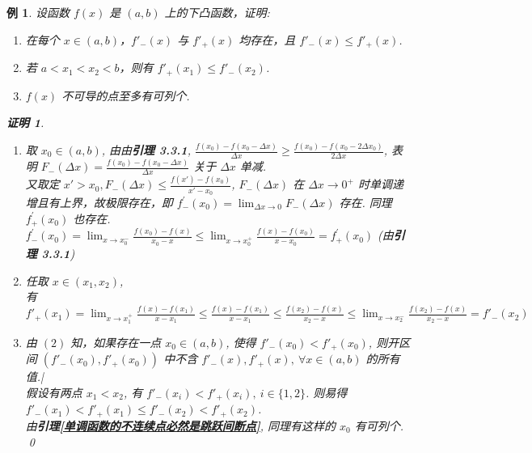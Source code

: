 \documentclass{ctexart}
\newcommand{\。}{．} %
\newcommand{\ds}{^\prime}
\newenvironment{zise}{
    \begin{tcolorbox}[enhanced, colback=qzi, boxrule=0pt, frame hidden,
        borderline west={0.7mm}{0.1mm}{szi}]
    }
    {\end{tcolorbox}}
\theoremstyle{t} %
\newtheorem{lthj}{\color{szi} 例}[subsection]
\newtheorem*{zmhj}{\color{slan} 证明}
\newenvironment{lt}{\begin{zise}\begin{lthj}}{\end{lthj}\end{zise}}
\begin{document}
\begin{lt}
    设函数 $f(x)$ 是 $(a, b)$ 上的下凸函数，证明:
    \begin{enumerate}
        \item [(1)] 在每个 $x \in (a, b)$，$f'_-(x)$ 与 $f'_+(x)$ 均存在，且 $f'_-(x) \leqslant f'_+(x)$.
        \item [(2)] 若 $a < x_1 < x_2 < b$，则有 $f'_+(x_1) \leqslant f'_-(x_2)$.
        \item [(3)] $f(x)$ 不可导的点至多有可列个.
    \end{enumerate}
    \begin{zmhj} \quad
        \begin{enumerate}
            \item [(1)] 取 $x_0 \in (a, b)$, 由由\textcolor{shuang}{\textbf{引理 3.3.1}}, $\frac{f(x_0) - f(x_0 - \Delta x)}{\Delta x} \geqslant \frac{f(x_0) - f(x_0 - 2 \Delta x_0)}{2\Delta x}$, 表明 $F_-(\Delta x) = \frac{f(x_0) - f(x_0 - \Delta x)}{\Delta x}$ 关于 $\Delta x$ 单减. \\
            又取定 $x' > x_0, F_-(\Delta x) \leqslant \frac{f(x') - f(x_0)}{x' - x_0}$, $F_-(\Delta x)$ 在 $\Delta x \to 0^+$ 时单调递增且有上界，故极限存在，即 $f\ds_-(x_0) = \lim_{\Delta x \to 0}F_-(\Delta x)$ 存在. 同理 $f\ds_+(x_0)$ 也存在.\\
            $f\ds_-(x_0) = \lim_{x \to x_0^-}\frac{f(x_0) - f(x)}{x_0 - x} \leqslant \lim_{x \to x_0^+}\frac{f(x) - f(x_0)}{x - x_0} = f\ds_+(x_0)$ \quad(由\textcolor{shuang}{\textbf{引理 3.3.1}}) 
            \item [(2)] 任取 $x \in (x_1, x_2)$, \\
            有 $f'_+(x_1) = \lim_{x \to x_1^+}\frac{f(x) - f(x_1)}{x - x_1} \leqslant \frac{f(x) - f(x_1)}{x - x_1} \leqslant \frac{f(x_2) - f(x)}{x_2 - x} \leqslant \lim_{x \to x_2^-}\frac{f(x_2) - f(x)}{x_2 - x} = f'_-(x_2)$
            \item [(3)] 由 $(2)$ 知，如果存在一点 $x_0 \in (a, b)$, 使得 $f'_-(x_0) < f'_+(x_0)$, 则开区间 $(f'_-(x_0), f'_+(x_0))$ 中不含 $f'_-(x), f'_+(x), \ \forall x \in (a, b)$ 的所有值.|\\
            假设有两点 $x_1 < x_2$, 有 $f'_-(x_i) < f'_+(x_i), \ i \in \{1, 2\}$. 则易得 $f'_-(x_1) < f'_+(x_1) \leqslant f'_-(x_2) < f'_+(x_2)$. \\
            由\textbf{引理\ref{单调函数的不连续点必然是跳跃间断点}}, 同理有这样的 $x_0$ 有可列个. \qed
        \end{enumerate}
    \end{zmhj}
\end{lt}
\end{document}
